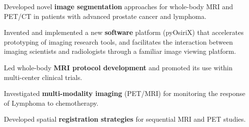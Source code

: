 \documentclass[]{mbcv}
\begin{document}
\begin{minipage}[t]{0.65\textwidth}
\begin{tightemize}
\item Developed novel \textbf{image segmentation} approaches for whole-body MRI and PET/CT in patients with advanced prostate cancer and lymphoma.

\item Invented and implemented a new \textbf{software} platform (pyOsiriX) that accelerates prototyping of imaging research tools, and facilitates the interaction between imaging scientists and radiologists through a familiar image viewing platform.

\item Led whole-body \textbf{MRI protocol development} and promoted its use within multi-center clinical trials. 

\end{tightemize}

\sectionsep


\begin{tightemize}

\item Investigated \textbf{multi-modality imaging} (PET/MRI) for monitoring the response of Lymphoma to chemotherapy.

\item Developed spatial \textbf{registration strategies} for sequential MRI and PET studies.

\end{tightemize}

\sectionsep

\end{minipage}
\end{document}
